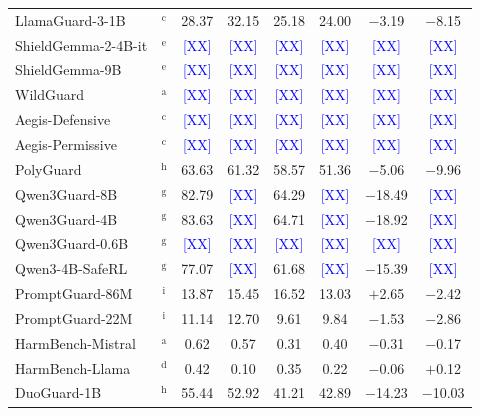 \begin{table}[t]
\begin{tabular}{lccccccc}
LlamaGuard-3-1B & $^\text{c}$ & 28.37 & 32.15 & 25.18 & 24.00 & $-$3.19 & $-$8.15 \\
ShieldGemma-2-4B-it & $^\text{e}$ & \textcolor{blue}{[XX]} & \textcolor{blue}{[XX]} & \textcolor{blue}{[XX]} & \textcolor{blue}{[XX]} & \textcolor{blue}{[XX]} & \textcolor{blue}{[XX]} \\
ShieldGemma-9B & $^\text{e}$ & \textcolor{blue}{[XX]} & \textcolor{blue}{[XX]} & \textcolor{blue}{[XX]} & \textcolor{blue}{[XX]} & \textcolor{blue}{[XX]} & \textcolor{blue}{[XX]} \\
WildGuard & $^\text{a}$ & \textcolor{blue}{[XX]} & \textcolor{blue}{[XX]} & \textcolor{blue}{[XX]} & \textcolor{blue}{[XX]} & \textcolor{blue}{[XX]} & \textcolor{blue}{[XX]} \\
Aegis-Defensive & $^\text{c}$ & \textcolor{blue}{[XX]} & \textcolor{blue}{[XX]} & \textcolor{blue}{[XX]} & \textcolor{blue}{[XX]} & \textcolor{blue}{[XX]} & \textcolor{blue}{[XX]} \\
Aegis-Permissive & $^\text{c}$ & \textcolor{blue}{[XX]} & \textcolor{blue}{[XX]} & \textcolor{blue}{[XX]} & \textcolor{blue}{[XX]} & \textcolor{blue}{[XX]} & \textcolor{blue}{[XX]} \\
PolyGuard & $^\text{h}$ & 63.63 & 61.32 & 58.57 & 51.36 & $-$5.06 & $-$9.96 \\
Qwen3Guard-8B & $^\text{g}$ & 82.79 & \textcolor{blue}{[XX]} & 64.29 & \textcolor{blue}{[XX]} & $-$18.49 & \textcolor{blue}{[XX]} \\
Qwen3Guard-4B & $^\text{g}$ & 83.63 & \textcolor{blue}{[XX]} & 64.71 & \textcolor{blue}{[XX]} & $-$18.92 & \textcolor{blue}{[XX]} \\
Qwen3Guard-0.6B & $^\text{g}$ & \textcolor{blue}{[XX]} & \textcolor{blue}{[XX]} & \textcolor{blue}{[XX]} & \textcolor{blue}{[XX]} & \textcolor{blue}{[XX]} & \textcolor{blue}{[XX]} \\
Qwen3-4B-SafeRL & $^\text{g}$ & 77.07 & \textcolor{blue}{[XX]} & 61.68 & \textcolor{blue}{[XX]} & $-$15.39 & \textcolor{blue}{[XX]} \\
PromptGuard-86M & $^\text{i}$ & 13.87 & 15.45 & 16.52 & 13.03 & $+$2.65 & $-$2.42 \\
PromptGuard-22M & $^\text{i}$ & 11.14 & 12.70 & 9.61 & 9.84 & $-$1.53 & $-$2.86 \\
HarmBench-Mistral & $^\text{a}$ & 0.62 & 0.57 & 0.31 & 0.40 & $-$0.31 & $-$0.17 \\
HarmBench-Llama & $^\text{d}$ & 0.42 & 0.10 & 0.35 & 0.22 & $-$0.06 & $+$0.12 \\
DuoGuard-1B & $^\text{h}$ & 55.44 & 52.92 & 41.21 & 42.89 & $-$14.23 & $-$10.03 \\

\end{tabular}
\end{table}
